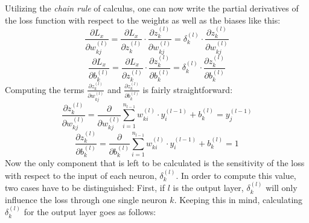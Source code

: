 Utilizing the \textit{chain rule} of calculus, one can now write the
partial derivatives of the loss function with respect to the weights
as well as the biases like this:
\begin{equation}
\label{eq:gradient-weight}
  \frac{\partial L_x}{\partial w_{kj}^{(l)}} = \frac{\partial
    L_x}{\partial z_k^{(l)}} \cdot \frac{\partial z_k^{(l)}}{\partial
    w_{kj}^{(l)}} = \delta_k^{(l)} \cdot \frac{\partial z_k^{(l)}}{\partial
    w_{kj}^{(l)}}
\end{equation}
\begin{equation}
\label{eq:gradient-bias}
  \frac{\partial L_x}{\partial b_k^{(l)}} = \frac{\partial
    L_x}{\partial z_k^{(l)}} \cdot \frac{\partial z_k^{(l)}}{\partial
    b_{k}^{(l)}} = \delta_k^{(l)} \cdot \frac{\partial z_k^{(l)}}{\partial
    b_{k}^{(l)}}
\end{equation}
Computing the terms \(\frac{\partial z_k^{(l)}}{\partial
  w_{kj}^{(l)}}\) and \(\frac{\partial z_k^{(l)}}{\partial
  b_{k}^{(l)}}\) is fairly straightforward:
\begin{equation}
\frac{\partial z_k^{(l)}}{\partial w_{kj}^{(l)}} =
\frac{\partial}{\partial
  w_{kj}^{(l)}}\sum_{i=1}^{n_{l-1}}{w_{ki}^{(l)} \cdot y_i^{(l-1)}} +
b_k^{(l)} = y_j^{(l-1)}
\end{equation}
\begin{equation}
\frac{\partial z_k^{(l)}}{\partial b_{k}^{(l)}} =
\frac{\partial}{\partial
  b_{k}^{(l)}}\sum_{i=1}^{n_{l-1}}{w_{ki}^{(l)} \cdot y_i^{(l-1)}} +
b_k^{(l)} = 1
\end{equation}
Now the only component that is left to be calculated is the
sensitivity of the loss with respect to the input of each neuron,
\(\delta_k^{(l)}\).
In order to compute this value, two cases have to be distinguished:
First, if \(l\) is the output layer, \(\delta_k^{(l)}\) will only
influence the loss through one single neuron \(k\). Keeping this in
mind, calculating \(\delta_k^{(l)}\) for the output layer goes as
follows:

